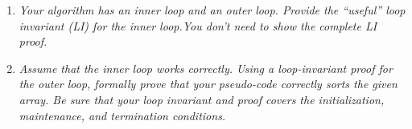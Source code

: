 \documentclass[12pt]{article}
\begin{document}
\begin{enumerate}
\begin{enumerate}

\pagebreak

\item \label{4c} {\itshape Your algorithm has an inner loop and an outer loop. Provide the ``useful'' loop invariant (LI) for the inner loop.You don't need to show the complete LI proof.} \\


\pagebreak

\item \label{4d} {\itshape Assume that the inner loop works correctly. Using a loop-invariant proof for the outer loop, formally prove that your pseudo-code correctly sorts the given array. Be sure that your loop invariant and proof covers the initialization, maintenance, and termination conditions. }



\pagebreak

\end{enumerate}
\end{enumerate}
\end{document}
